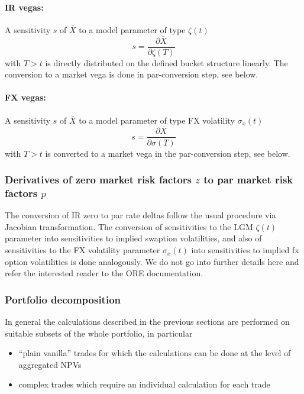 \documentclass[11pt,a4paper,oneside]{article}
\begin{document}
\noindent\paragraph{IR vegas:}
A sensitivity $s$ of $\bar{X}$ to a model parameter of type $\zeta(t)$
$$
s = \frac{\partial\bar{X}}{\partial \zeta(T)}
$$
with $T>t$ is directly distributed on the defined bucket structure linearly. The conversion to a market vega is done in
par-conversion step, see below.

\noindent\paragraph{FX vegas:}
A sensitivity $s$ of $\bar{X}$ to a model parameter of type FX volatility $\sigma_x(t)$
$$
s = \frac{\partial\bar{X}}{\partial \sigma(T)}
$$
with $T>t$ is converted to a market vega in the par-conversion step, see below.

\subsubsection*{Derivatives of zero market risk factors $z$ to par market risk factors $p$}

The conversion of IR zero to par rate deltas follow the usual procedure via Jacobian transformation. The conversion of
sensitivities to the LGM $\zeta(t)$ parameter into sensitivities to implied swaption volatilities, and also of
sensitivities to the FX volatility parameter $\sigma_x(t)$ into sensitivities to implied fx option volatilities
is done analogously. We do not go into further details here and refer the interested reader to the ORE documentation.

\subsubsection*{Portfolio decomposition}\label{aad:dynamic_delta_subportfolios}

In general the calculations described in the previous sections are performed on suitable subsets of the whole
portfolio, in particular

\begin{itemize}
\item ``plain vanilla'' trades for which the calculations can be done at the level of aggregated NPVs
\item complex trades which require an individual calculation for each trade
\end{itemize}
\end{document}
